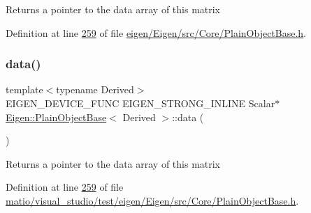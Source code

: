 \begin{DoxyReturn}{Returns}
a pointer to the data array of this matrix 
\end{DoxyReturn}


Definition at line \hyperlink{eigen_2_eigen_2src_2_core_2_plain_object_base_8h_source_l00259}{259} of file \hyperlink{eigen_2_eigen_2src_2_core_2_plain_object_base_8h_source}{eigen/\+Eigen/src/\+Core/\+Plain\+Object\+Base.\+h}.

\mbox{\label{class_eigen_1_1_plain_object_base_a54ed64f45b2f5e852355d5e2311810bd}} 
\subsubsection{\texorpdfstring{data()}{data()}\hspace{0.1cm}{\footnotesize\ttfamily [4/4]}}
{\footnotesize\ttfamily template$<$typename Derived$>$ \\
E\+I\+G\+E\+N\+\_\+\+D\+E\+V\+I\+C\+E\+\_\+\+F\+U\+NC E\+I\+G\+E\+N\+\_\+\+S\+T\+R\+O\+N\+G\+\_\+\+I\+N\+L\+I\+NE Scalar$\ast$ \hyperlink{class_eigen_1_1_plain_object_base}{Eigen\+::\+Plain\+Object\+Base}$<$ Derived $>$\+::data (\begin{DoxyParamCaption}{ }\end{DoxyParamCaption})\hspace{0.3cm}{\ttfamily [inline]}}

\begin{DoxyReturn}{Returns}
a pointer to the data array of this matrix 
\end{DoxyReturn}


Definition at line \hyperlink{matio_2visual__studio_2test_2eigen_2_eigen_2src_2_core_2_plain_object_base_8h_source_l00259}{259} of file \hyperlink{matio_2visual__studio_2test_2eigen_2_eigen_2src_2_core_2_plain_object_base_8h_source}{matio/visual\+\_\+studio/test/eigen/\+Eigen/src/\+Core/\+Plain\+Object\+Base.\+h}.

\mbox{\label{class_eigen_1_1_plain_object_base_a6008cee3b716d514b3e14c1bc7c0d34a}} 
